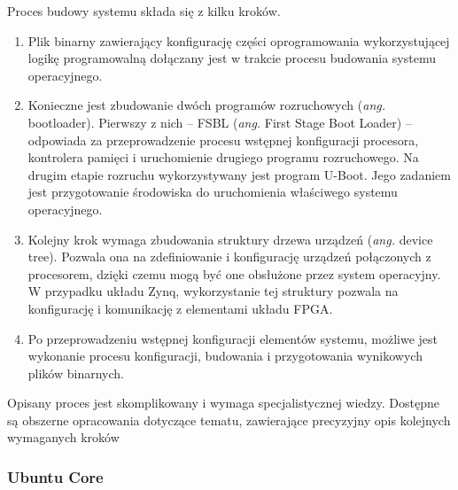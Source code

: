 Proces budowy systemu składa się z kilku kroków. 
\begin{enumerate}
\item Plik binarny zawierający konfigurację części oprogramowania wykorzystującej logikę programowalną dołączany jest w trakcie procesu budowania systemu operacyjnego.%

\item Konieczne jest zbudowanie dwóch programów rozruchowych (\emph{ang.} bootloader). %
Pierwszy z nich -- FSBL (\emph{ang.} First Stage Boot Loader) -- odpowiada za przeprowadzenie procesu wstępnej konfiguracji procesora, kontrolera pamięci i uruchomienie drugiego programu rozruchowego. 
Na drugim etapie rozruchu wykorzystywany jest program U-Boot. 
Jego zadaniem jest przygotowanie środowiska do uruchomienia właściwego systemu operacyjnego.

\item Kolejny krok wymaga zbudowania struktury drzewa urządzeń (\emph{ang.} device tree). 
Pozwala ona na zdefiniowanie i konfigurację urządzeń połączonych z procesorem, dzięki czemu mogą być one obsłużone przez system operacyjny. 
W przypadku układu Zynq, wykorzystanie tej struktury pozwala na konfigurację i komunikację z elementami układu FPGA. %

\item Po przeprowadzeniu wstępnej konfiguracji elementów systemu, możliwe jest wykonanie procesu konfiguracji, budowania i przygotowania wynikowych plików binarnych.
\end{enumerate}
Opisany proces jest skomplikowany i wymaga specjalistycznej wiedzy. 
Dostępne są obszerne opracowania dotyczące tematu, zawierające precyzyjny opis kolejnych wymaganych kroków \cite{zybo-zynq-getting-started,zybo-stock-linux,xilinx-build-kernel}


\subsubsection{Ubuntu Core}

